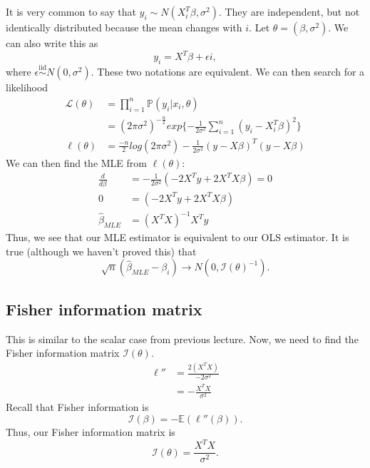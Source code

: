 \documentclass[titlepage, 12pt, leqno]{article}
\begin{document}
It is very common to say that $y_{i} \sim N(X_{i}^{T}\beta,\sigma^{2})$. They
are independent, but not identically distributed because the mean changes with
$i$. Let $\theta = (\beta, \sigma^{2})$. We can also write this as
\[
y_{i} = X^{T}\beta + \epsilon{i},
\]
where $\epsilon \overset{\mathrm{iid}}{\sim} N(0, \sigma^{2})$. These two 
notations are equivalent. We can then search for a likelihood
\begin{align*}
    \mathcal{L}(\theta) 
    &= \prod_{i=1}^{n}\mathbb{P}(y_{i}|x_{i}, \theta)\\
    &= (2\pi \sigma^{2})^{-\frac{n}{2}}exp\{-\frac{1}{2\sigma^{2}}
    \sum_{i=1}^{n}(y_{i} - X_{i}^{T}\beta)^{2}\} \\
    \ell(\theta) &= \frac{-n}{2}log(2\pi\sigma^{2}) - \frac{1}{2\sigma^{2}}
    (y-X\beta)^{T}(y-X\beta)
\end{align*}
We can then find the MLE from $\ell(\theta)$:
\begin{align*}
    \frac{d}{d\beta}
    &= -\frac{1}{2\sigma^{2}}(-2X^{T}y + 2X^{T}X\beta) = 0\\
    0 &= (-2X^{T}y + 2X^{T}X\beta) \\
    \hat \beta_{MLE} &= (X^{T}X)^{-1}X^{T}y
\end{align*}
Thus, we see that our MLE estimator is equivalent to our OLS estimator. It is
true (although we haven't proved this) that
\[
\sqrt{n}(\hat \beta_{MLE} - \beta_{i}) \rightarrow N(0,\mathcal{I}(\theta)^{-1}).
\]
\subsection{Fisher information matrix}

This is similar to the scalar case from previous lecture. Now, we need to
find the Fisher information matrix $\mathcal{I}(\theta)$.
\begin{align*}
    \ell'' 
    &= \frac{2(X^{T}X)}{-2\sigma^{2}} \\
    &= -\frac{X^{T}X}{\sigma^{2}}
\end{align*}
Recall that Fisher information is
\[
\mathcal{I}(\beta) = -\mathbb{E}(\ell''(\beta)).
\]
Thus, our Fisher information matrix is
\[
    \mathcal{I}(\theta) = \frac{X^{T}X}{\sigma^{2}}.
\]
\pagebreak
\end{document}
